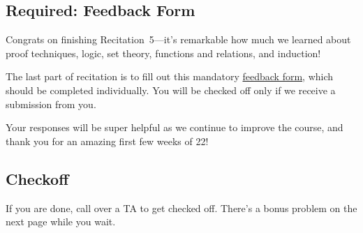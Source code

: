 \documentclass[12pt,letterpaper]{article}
\newif\ifsol
\newcommand{\solu}[2]{ \begin{mdframed} \ifsol #2 \else \vspace{#1} \fi \end{mdframed} }
\begin{document}
\solu{9cm}{Let $P(n)$ be the predicate that, given a bar of $n$ squares, any sequence of $n-1$ breaks will reduce it to single squares. 

\textbf{Base Case:} $P(1)$: Given a bar with 1 square, 0 breaks leaves us with one square. Hurrah!

\textbf{Inductive Hypothesis:} Let $k$ be some arbitrary positive integer. For all positive integers $i \leq k$, assume $P(i)$. That is, assume that for a bar of length $i$, any sequence of $i-1$ breaks will reduce it to single squares.

\textbf{Inductive Step:}  Consider a candy bar with $k + 1$ squares.
Make some break. Let's say we make it after the $p$th square, where $p$ is some positive integer. Then, we have two candy bars, one of length $p$, the other of length $k + 1 - p$. Both $p$ and $k + 1 - p$ are positive integers less than $k+1$, as we are breaking the bar into two positive pieces. By our inductive hypothesis, we know that it takes $p - 1$ breaks to break up the first, and $(k + 1) - p - 1$ to break up the second. These breaks result in a total of: $(p - 1) + ((k + 1 - p) - 1) = k + 1 - 2$ breaks. We then have that our initial break plus this number of breaks is: $1 + (k + 1 - 2) = (k + 1) - 1$ breaks, as needed. That shows $P(k+1)$ is true. \\

\textbf{Conclusion}: As $P(1)$ is true and for any positive integer $k$, and $P(1), \ldots. P(k)$ imply $P(k+1)$, $P(n)$ is true for all positive integers $n$.}


\subsection*{Required: Feedback Form}
Congrats on finishing Recitation~5---it's remarkable how much we learned about proof techniques, logic, set theory, functions and relations, and induction!

The last part of recitation is to fill out this mandatory \href{https://forms.gle/i9Zkq99XyaoweysF8}{\color{blue} feedback form}, which should be completed individually. You will be checked off only if we receive a submission from you.

Your responses will be super helpful as we continue to improve the course, and thank you for an amazing first few weeks of 22!

\subsection*{Checkoff}
If you are done, call over a TA to get checked off. There's a bonus problem on the next page while you wait.
\end{document}
